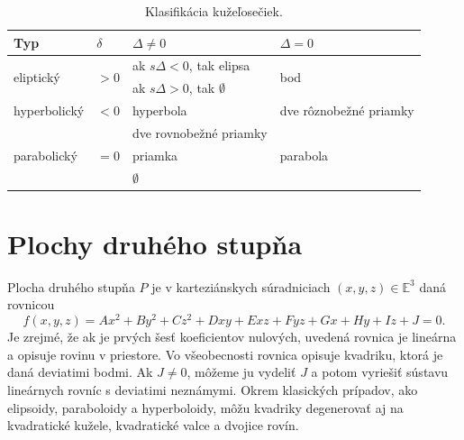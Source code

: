 
\begin{table}[h]
\centering
\begin{tabular}{|l|l|l|l|}
\hline
\textbf{Typ} & $\delta$ & $\Delta \neq  0$ & $\Delta = 0 $ \\
\hline
\multirow{2}{*}{eliptický} & \multirow{2}{*}{$> 0$} & ak $s\Delta < 0$, tak elipsa & \multirow{2}{*}{bod} \\
& & ak $s\Delta > 0$, tak $\emptyset$ & \\
\hline
hyperbolický & $< 0$ & hyperbola & dve rôznobežné priamky \\
\hline
\multirow{3}{*}{parabolický} & \multirow{3}{*}{$= 0$} & dve rovnobežné priamky & \multirow{3}{*}{parabola} \\
& & priamka & \\
& & $\emptyset$ & \\
\hline
\end{tabular}
\caption{Klasifikácia kužeľosečiek.}
\label{tab:conic_sections}
\end{table}

\section{Plochy druhého stupňa}
Plocha druhého stupňa $P$ je v karteziánskych súradniciach $(x, y, z) \in \mathbb{E}^3$ daná rovnicou
\[ f(x, y, z) = Ax^2 + By^2 + Cz^2 + Dxy + Exz + Fyz + Gx + Hy + Iz + J = 0. \]
Je zrejmé, že ak je prvých šesť koeficientov nulových, uvedená rovnica je lineárna a opisuje rovinu v priestore. Vo všeobecnosti rovnica opisuje kvadriku, ktorá je daná deviatimi bodmi. Ak $J \neq 0$, môžeme ju vydeliť $J$ a potom vyriešiť sústavu lineárnych rovníc s deviatimi neznámymi. Okrem klasických prípadov, ako elipsoidy, paraboloidy a hyperboloidy, môžu kvadriky degenerovať aj na kvadratické kužele, kvadratické valce a dvojice rovín.

